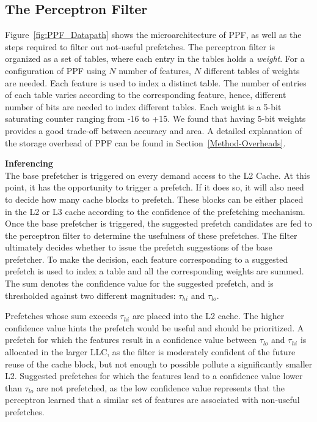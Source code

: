 \subsection{The Perceptron Filter}
\label{Arch-Perceptron}

Figure~\ref{fig:PPF_Datapath} shows the microarchitecture of PPF, as
well as the steps required to filter out not-useful prefetches. The
perceptron filter is organized as a set of tables, where each entry in
the tables holds a \textit{weight}.  For a configuration of PPF using
$N$ number of features, $N$ different tables of weights are needed.
Each feature is used to index a distinct table. The number of entries
of each table varies according to the corresponding feature, hence,
different number of bits are needed to index different tables. Each
weight is a 5-bit saturating counter ranging from -16 to +15. We found
that having 5-bit weights provides a good trade-off between accuracy
and area. A detailed explanation of the storage overhead of PPF can
be found in Section~\ref{Method-Overheads}.


\noindent \textbf{Inferencing}\\
The base prefetcher is triggered on every demand access to the L2
Cache.  At this point, it has the opportunity to trigger a prefetch.
If it does so, it will also need to decide how many cache blocks to
prefetch.  These blocks can be either placed in the L2 or L3 cache
according to the confidence of the prefetching mechanism.  Once the
base prefetcher is triggered, the suggested prefetch candidates are
fed to the perceptron filter to determine the usefulness of these
prefetches. The filter ultimately decides whether to issue the
prefetch suggestions of the base prefetcher. To make the decision,
each feature corresponding to a suggested prefetch is used to index a
table and all the corresponding weights are summed. The sum denotes
the confidence value for the suggested prefetch, and is thresholded
against two different magnitudes: $\tau_{hi}$ and $\tau_{lo}$.

Prefetches whose sum exceeds $\tau_{hi}$ are placed into the L2 cache.
The higher confidence value hints the prefetch would be useful and
should be prioritized.  A prefetch for which the features result in a
confidence value between $\tau_{lo}$ and $\tau_{hi}$ is allocated in
the larger LLC, as the filter is moderately confident of the future
reuse of the cache block, but not enough to possible pollute a
significantly smaller L2.  Suggested prefetches for which the features
lead to a confidence value lower than $\tau_{lo}$ are not prefetched,
as the low confidence value represents that the perceptron learned
that a similar set of features are associated with non-useful
prefetches.

